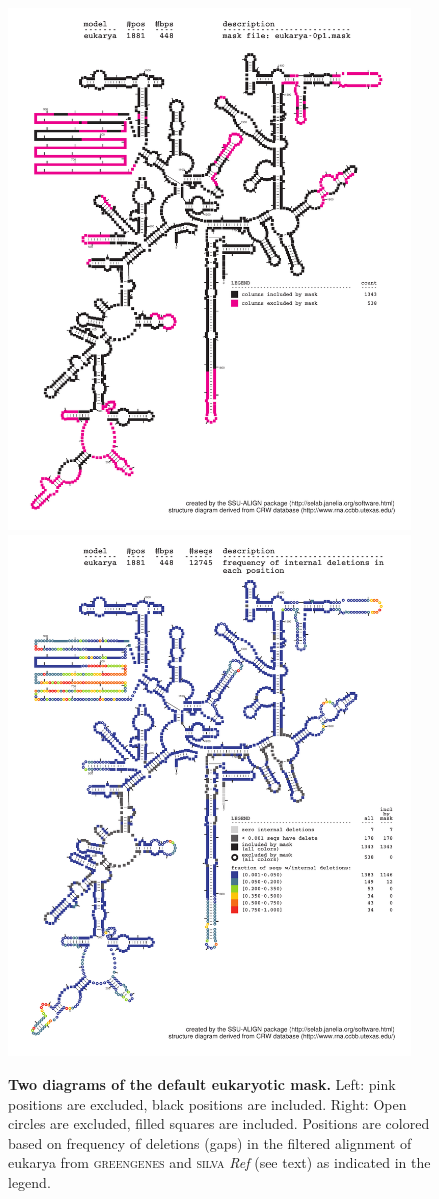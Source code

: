 \begin{figure}
  \begin{center}
\includegraphics[width=4.2in]{Figures/eukarya-0p1-mask}
\includegraphics[width=4.2in]{Figures/eukarya-ggsilR-dint-wmask}
  \end{center}
\caption{\textbf{Two diagrams of the default eukaryotic mask.} Left: pink positions are excluded,
  black positions are included. Right: Open circles are excluded,
  filled squares are included. Positions are colored based on
  frequency of deletions (gaps) in the filtered alignment of eukarya
  from \textsc{greengenes} and \textsc{silva} \emph{Ref} (see text) as
  indicated in the legend.}
\label{fig:mask-euk}
\end{figure}
